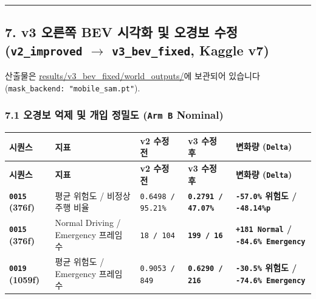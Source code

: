 \documentclass[10.5pt,a4paper]{article}
\begin{document}
\par\noindent\rule{\textwidth}{0.4pt}\par\medskip

\subsection{7. v3 오른쪽 BEV 시각화 및 오경보 수정 (\texttt{v2\_\allowbreak{}improved} $\rightarrow$ \texttt{v3\_\allowbreak{}bev\_\allowbreak{}fixed}, Kaggle v7)}

산출물은 \href{https://github.com/Heisnotanimposter/Totalcare\_autonomous\_driving\_Yolov5/tree/main/results/v3\_bev\_fixed/world\_outputs}{results/v3\_bev\_fixed/world\_outputs/}에 보관되어 있습니다(\texttt{mask\_\allowbreak{}backend:\allowbreak{} "mobile\_\allowbreak{}sam.\allowbreak{}pt"}).


\subsubsection{7.1 오경보 억제 및 개입 정밀도 (\texttt{Arm B} Nominal)}

\begin{footnotesize}
\setlength{\tabcolsep}{4pt}
\setlength{\LTleft}{0pt}\setlength{\LTright}{0pt}
\begin{longtable}{>{\raggedright\arraybackslash}p{} >{\raggedright\arraybackslash}p{} >{\raggedright\arraybackslash}p{} >{\raggedright\arraybackslash}p{} >{\raggedright\arraybackslash}p{}}
\toprule
\textbf{시퀀스} & \textbf{지표} & \textbf{v2 수정 전} & \textbf{v3 수정 후} & \textbf{변화량 (\texttt{Delta})} \\
\midrule
\endfirsthead
\toprule
\textbf{시퀀스} & \textbf{지표} & \textbf{v2 수정 전} & \textbf{v3 수정 후} & \textbf{변화량 (\texttt{Delta})} \\
\midrule
\endhead
\bottomrule
\endfoot
\textbf{\texttt{0015} (376f)} & 평균 위험도 / 비정상 주행 비율 & \texttt{0.\allowbreak{}6498 /\allowbreak{} 95.\allowbreak{}21\%} & \textbf{\texttt{0.\allowbreak{}2791 /\allowbreak{} 47.\allowbreak{}07\%}} & \textbf{\texttt{-\allowbreak{}57.\allowbreak{}0\%} 위험도 / \texttt{-\allowbreak{}48.\allowbreak{}14\%p}} \\
\textbf{\texttt{0015} (376f)} & Normal Driving / Emergency 프레임 수 & \texttt{18 /\allowbreak{} 104} & \textbf{\texttt{199 /\allowbreak{} 16}} & \textbf{\texttt{+181 Normal} / \texttt{-\allowbreak{}84.\allowbreak{}6\% Emergency}} \\
\textbf{\texttt{0019} (1059f)} & 평균 위험도 / Emergency 프레임 수 & \texttt{0.\allowbreak{}9053 /\allowbreak{} 849} & \textbf{\texttt{0.\allowbreak{}6290 /\allowbreak{} 216}} & \textbf{\texttt{-\allowbreak{}30.\allowbreak{}5\%} 위험도 / \texttt{-\allowbreak{}74.\allowbreak{}6\% Emergency}} \\
\end{longtable}
\end{footnotesize}
\end{document}
